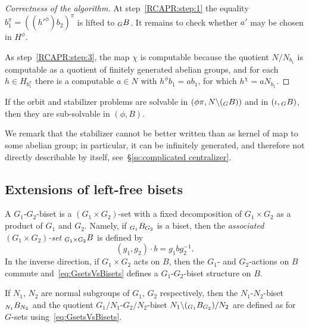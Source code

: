 \documentclass{amsart}
\begin{document}
\begin{proof}[Correctness of the algorithm]
  At step~\eqref{RCAPR:step:1} the equality
  $b_1^\pi=((h'^\phi)b_2)^\pi$ is lifted to $\subscript G B$. It
  remains to check whether $a'$ may be chosen in $H^\phi$.

  As step~\eqref{RCAPR:step:3}, the map $\chi$ is computable because
  the quotient $N/N_{b_1}$ is computable as a quotient of finitely
  generated abelian groups, and for each $h\in H_{b_1^\pi}$ there is a
  computable $a\in N$ with $h^\phi b_1=ab_1$, for which
  $h^\chi=a N_{b_1}$.
\end{proof}

\begin{cor}
 If the orbit and stabilizer problems are
  solvable in $(\phi\pi,N\backslash(\subscript G B))$ and in $(\iota,\subscript G B)$,
  then they are sub-solvable in $(\phi,B)$.
\end{cor}

We remark that the stabilizer cannot be better written than as kernel
of map to some abelian group; in particular, it can be infinitely
generated, and therefore not directly describable by itself,
see~\S\ref{ss:complicated centralizer}.

\subsection{Extensions of left-free bisets}
A $G_1$-$G_2$-biset is a $(G_1\times G_2)$-set with a fixed
decomposition of $G_1\times G_2$ as a product of $G_1$ and $G_2$.
Namely, if $\subscript{G_1}B_{G_2}$ is a biset, then the \textit{associated
  $(G_1\times G_2)$-set} $\subscript{G_1\times G_2}B$ is defined by
\begin{equation}\label{eq:GsetsVsBisets}
  (g_1,g_2)\cdot b=g_1 b g_2^{-1}.
\end{equation}
In the inverse direction, if $G_1\times G_2$ acts on $B$, then the
$G_1$- and $G_2$-actions on $B$ commute and~\eqref{eq:GsetsVsBisets}
defines a $G_1$-$G_2$-biset structure on $B$.

If $N_1$, $N_2$ are normal subgroups of $G_1$, $G_2$ respectively,
then the $N_1$-$N_2$-biset $\subscript{N_1}B_{N_2}$ and the quotient
$G_1/N_1$-$G_2/N_2$-biset $N_1\backslash(\subscript{G_1}B_{G_2})/N_2$ are
defined as for $G$-sets using~\eqref{eq:GsetsVsBisets}.
\end{document}
